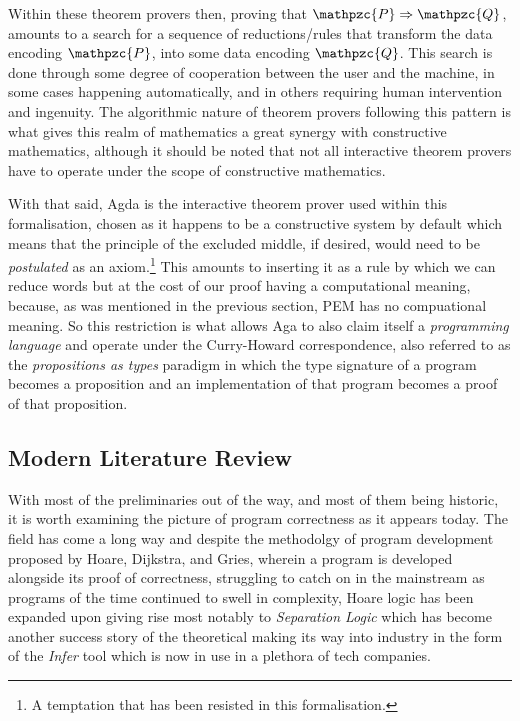 \documentclass[oneside,12pt]{article}
\newcommand{\textM}[1]{\ensuremath{\mathpzc{#1}}}
\begin{document}
Within these theorem provers then, proving that $\textM{P} \Rightarrow \textM{Q}$, amounts to a search for a sequence of reductions/rules that transform the data encoding \textM{P}, into some data encoding \textM{Q}. This search is done through some degree of cooperation between the user and the machine, in some cases happening automatically, and in others requiring human intervention and ingenuity. The algorithmic nature of theorem provers following this pattern is what gives this realm of mathematics a great synergy with constructive mathematics, although it should be noted that not all interactive theorem provers have to operate under the scope of constructive mathematics.


With that said, Agda\cite{norell2007towards} is the interactive theorem prover used within this formalisation, chosen as it happens to be a constructive system by default which means that the principle of the excluded middle, if desired, would need to be \emph{postulated} as an axiom.\footnote{A temptation that has been resisted in this formalisation.} This amounts to inserting it as a rule by which we can reduce words but at the cost of our proof having a computational meaning, because, as was mentioned in the previous section, PEM has no compuational meaning. So this restriction is what allows Aga to also claim itself a \emph{programming language} and operate under the Curry-Howard correspondence, also referred to as the \emph{propositions as types} paradigm in which the type signature of a program becomes a proposition and an implementation of that program becomes a proof of that proposition.


\subsection{Modern Literature Review}

With most of the preliminaries out of the way, and most of them being historic, it is worth examining the picture of program correctness as it appears today. The field has come a long way and despite the methodolgy of program development proposed by Hoare, Dijkstra, and Gries, wherein a program is developed alongside its proof of correctness, struggling to catch on in the mainstream as programs of the time continued to swell in complexity, Hoare logic has been expanded upon giving rise most notably to \emph{Separation Logic} which has become another success story of the theoretical making its way into industry in the form of the \emph{Infer} tool which is now in use in a plethora of tech companies.
\end{document}
